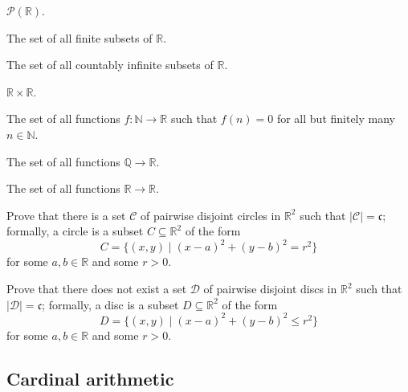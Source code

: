 \begin{chapex}
\label{cqFindCardinalityBegin}
$\mathcal{P}(\mathbb{R})$.
\end{chapex}

\begin{chapex}
The set of all finite subsets of $\mathbb{R}$.
\end{chapex}

\begin{chapex}
The set of all countably infinite subsets of $\mathbb{R}$.
\end{chapex}

\begin{chapex}
$\mathbb{R} \times \mathbb{R}$.
\end{chapex}

\begin{chapex}
The set of all functions $f : \mathbb{N} \to \mathbb{R}$ such that $f(n) = 0$ for all but finitely many $n \in \mathbb{N}$.
\end{chapex}

\begin{chapex}
The set of all functions $\mathbb{Q} \to \mathbb{R}$.
\end{chapex}

\begin{chapex}
\label{cqFindCardinalityEnd}
The set of all functions $\mathbb{R} \to \mathbb{R}$.
\end{chapex}

\begin{chapex}
Prove that there is a set $\mathcal{C}$ of pairwise disjoint circles in $\mathbb{R}^2$ such that $|\mathcal{C}| = \mathfrak{c}$; formally, a circle is a subset $C \subseteq \mathbb{R}^2$ of the form
\[ C = \{ (x,y) \mid (x-a)^2 + (y-b)^2 = r^2 \} \]
for some $a,b \in \mathbb{R}$ and some $r > 0$.
\end{chapex}

\begin{chapex}
\label{cqDiscsInPlane}
Prove that there does not exist a set $\mathcal{D}$ of pairwise disjoint discs in $\mathbb{R}^2$ such that $|\mathcal{D}| = \mathfrak{c}$; formally, a disc is a subset $D \subseteq \mathbb{R}^2$ of the form
\[ D = \{ (x,y) \mid (x-a)^2 + (y-b)^2 \le r^2 \} \]
for some $a,b \in \mathbb{R}$ and some $r>0$.
\end{chapex}

\subsection*{Cardinal arithmetic}

